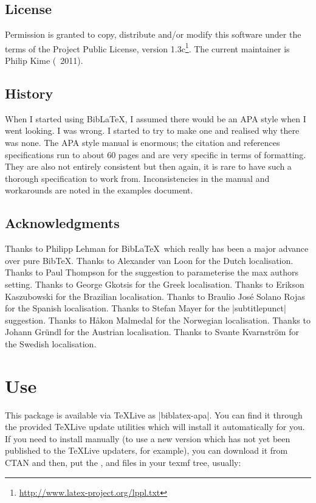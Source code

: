 \documentclass{ltxdockit}
\begin{document}
\subsection{License}

Permission is granted to copy, distribute and/or modify this software under
the terms of the \latex Project Public License, version
1.3c\footnote{\url{http://www.latex-project.org/lppl.txt}}. The current
maintainer is Philip Kime (\textcopyright\ 2011).

\subsection{History}

When I started using Bib\LaTeX, I assumed there would be an APA style
when I went looking. I was wrong. I started to try to make one and realised
why there was none. The APA style manual is enormous; the citation and
references specifications run to about 60 pages and are very specific in
terms of formatting. They are also not entirely consistent but then again,
it is rare to have such a thorough specification to work from.
Inconsistencies in the manual and workarounds are noted in the examples
document.

\subsection{Acknowledgments}

Thanks to Philipp Lehman for Bib\LaTeX\ which really has been a major
advance over pure Bib\TeX. Thanks to Alexander van Loon for the Dutch
localisation. Thanks to Paul Thompson for the suggestion to
parameterise the max authors setting. Thanks to George Gkotsis for the
Greek localisation. Thanks to Erikson Kaszubowski for the Brazilian
localisation. Thanks to Braulio José Solano Rojas for the Spanish
localisation. Thanks to Stefan Mayer for the |subtitlepunct| suggestion.
Thanks to Håkon Malmedal for the Norwegian localisation. Thanks to
Johann Gründl for the Austrian localisation. Thanks to Svante Kvarnström
for the Swedish localisation.

\section{Use}\label{ref:use}
\label{use}
This package is available via \TeX Live as |biblatex-apa|. You can find it
through the provided \TeX Live update utilities which will install it
automatically for you. If you need to install manually (to use a new
version which has not yet been published to the \TeX Live updaters, for
example), you can download it from CTAN and then, put the ,
 and  files in your texmf tree, usually:\\ 
\end{document}
